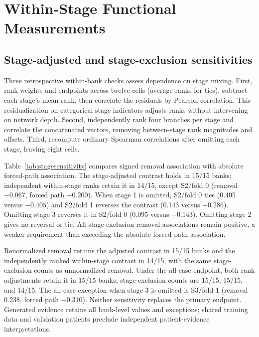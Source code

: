 \documentclass[mathematics,article,submit,pdftex,moreauthors]{Definitions/mdpi}
\begin{document}
\section{Within-Stage Functional Measurements}\label{app:stage}
\subsection{Stage-adjusted and stage-exclusion sensitivities}
Three retrospective within-bank checks assess dependence on stage mixing.
First, rank weights and endpoints across twelve cells (average ranks for
ties), subtract each stage's mean rank, then correlate the residuals by
Pearson correlation. This residualization on categorical stage indicators
adjusts ranks without intervening on network depth. Second, independently
rank four branches per stage and correlate the concatenated vectors, removing
between-stage rank magnitudes and offsets. Third, recompute ordinary Spearman
correlations after omitting each stage, leaving eight cells.

Table~\ref{tab:stagesensitivity} compares signed removal association with
absolute forced-path association. The stage-adjusted contrast holds in
15/15 banks; independent within-stage ranks retain it in 14/15, except S2/fold 0
(removal $-0.067$, forced path $-0.200$). When stage 1 is omitted, S2/fold 0
ties (0.405 versus $-0.405$) and S2/fold 1 reverses the contrast (0.143 versus
$-0.286$). Omitting stage 3 reverses it in S2/fold 0 (0.095 versus $-0.143$).
Omitting stage 2 gives no reversal or tie. All stage-exclusion removal
associations remain positive, a weaker requirement than exceeding the
absolute forced-path association.

\begin{table}[H]
\caption{Retrospective stage sensitivities on the fifteen terminal banks.
Positive counts removal associations above zero. Stronger/tie/weaker counts
compare signed removal with absolute forced-path association (tie tolerance
$10^{-12}$). Correlation columns report median [minimum, maximum] across
banks. Each ordinary within-stage correlation uses four branches; adjusted
and concatenated-rank correlations use twelve cells; exclusions use eight.
Counts are descriptive, not independent binomial trials.}
\label{tab:stagesensitivity}
\centering\footnotesize\setlength{\tabcolsep}{2pt}

\end{table}

Renormalized removal retains the adjusted contrast in 15/15 banks and the
independently ranked within-stage contrast in 14/15, with the same
stage-exclusion counts as unnormalized removal. Under the all-case endpoint,
both rank adjustments retain it in 15/15 banks; stage-exclusion counts are
15/15, 15/15, and 14/15. The all-case exception when stage 3 is omitted is
S3/fold 1 (removal 0.238, forced path $-0.310$). Neither sensitivity replaces
the primary endpoint. Generated evidence retains all bank-level values and
exceptions; shared training data and validation patients preclude independent
patient-evidence interpretations.
\end{document}
